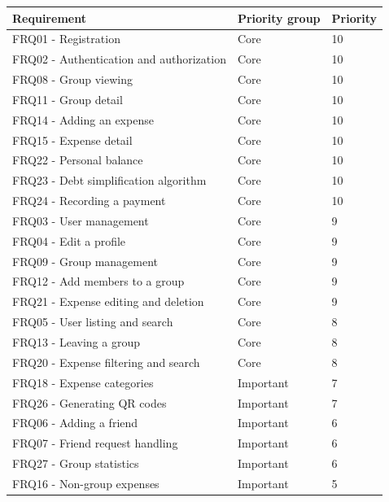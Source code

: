 \documentclass{ctuthesis}
\begin{document}
\begin{table}[ht!]
\centering
\begin{tabularx}{\textwidth}{|X|p{2.7cm}|l|}
\hline
\textbf{Requirement} & \textbf{Priority group} & \textbf{Priority} \\ \hline

\rowcolor{green!15} FRQ01 - Registration & Core & 10 \\ \hline
\rowcolor{green!15} FRQ02 - Authentication and authorization & Core & 10 \\ \hline
\rowcolor{green!15} FRQ08 - Group viewing & Core & 10 \\ \hline
\rowcolor{green!15} FRQ11 - Group detail & Core & 10 \\ \hline
\rowcolor{green!15} FRQ14 - Adding an expense & Core & 10 \\ \hline
\rowcolor{green!15} FRQ15 - Expense detail & Core & 10 \\ \hline
\rowcolor{green!15} FRQ22 - Personal balance & Core & 10 \\ \hline
\rowcolor{green!15} FRQ23 - Debt simplification algorithm & Core & 10 \\ \hline
\rowcolor{green!15} FRQ24 - Recording a payment & Core & 10 \\ \hline
\rowcolor{green!15} FRQ03 - User management & Core & 9 \\ \hline
\rowcolor{green!15} FRQ04 - Edit a profile & Core & 9 \\ \hline
\rowcolor{green!15} FRQ09 - Group management & Core & 9 \\ \hline
\rowcolor{green!15} FRQ12 - Add members to a group & Core & 9 \\ \hline
\rowcolor{green!15} FRQ21 - Expense editing and deletion & Core & 9 \\ \hline
\rowcolor{green!15} FRQ05 - User listing and search & Core & 8 \\ \hline
\rowcolor{green!15} FRQ13 - Leaving a group & Core & 8 \\ \hline
\rowcolor{green!15} FRQ20 - Expense filtering and search & Core & 8 \\ \hline

\rowcolor{green!15} FRQ18 - Expense categories & Important & 7 \\ \hline
\rowcolor{green!15} FRQ26 - Generating QR codes & Important & 7 \\ \hline
\rowcolor{green!15} FRQ06 - Adding a friend & Important & 6 \\ \hline
\rowcolor{green!15} FRQ07 - Friend request handling & Important & 6 \\ \hline
\rowcolor{green!15} FRQ27 - Group statistics & Important & 6 \\ \hline
\rowcolor{green!15} FRQ16 - Non-group expenses & Important & 5 \\ \hline


\end{tabularx}
\end{table}
\end{document}
